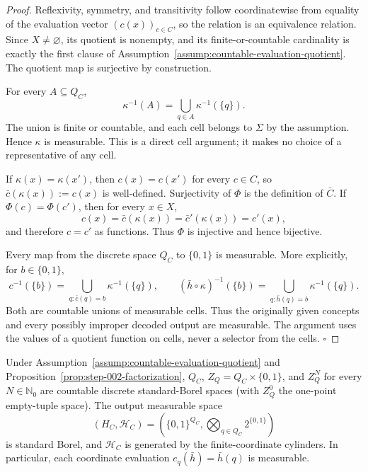 \begin{proof}
Reflexivity, symmetry, and transitivity follow coordinatewise from
equality of the evaluation vector \((c(x))_{c\in C}\), so the relation is an
equivalence relation. Since \(X\ne\varnothing\), its quotient is nonempty,
and its finite-or-countable cardinality is exactly the first clause of
Assumption~\ref{assump:countable-evaluation-quotient}. The quotient map is
surjective by construction.

For every \(A\subseteq Q_C\),
\[
\kappa^{-1}(A)=\bigcup_{q\in A}\kappa^{-1}(\{q\}).
\tag{1}
\]
The union is finite or countable, and each cell belongs to \(\Sigma\) by the
assumption. Hence \(\kappa\) is measurable. This is a direct cell argument;
it makes no choice of a representative of any cell.

If \(\kappa(x)=\kappa(x')\), then \(c(x)=c(x')\) for every \(c\in C\), so
\(\bar c(\kappa(x)):=c(x)\) is well-defined. Surjectivity of \(\Phi\) is the
definition of \(\bar C\). If \(\Phi(c)=\Phi(c')\), then for every \(x\in X\),
\[
c(x)=\bar c(\kappa(x))=\bar c'(\kappa(x))=c'(x),
\]
and therefore \(c=c'\) as functions. Thus \(\Phi\) is injective and hence
bijective.

Every map from the discrete space \(Q_C\) to \(\{0,1\}\) is measurable. More
explicitly, for \(b\in\{0,1\}\),
\[
c^{-1}(\{b\})
=\bigcup_{q:\bar c(q)=b}\kappa^{-1}(\{q\}),
\qquad
(\bar h\circ\kappa)^{-1}(\{b\})
=\bigcup_{q:\bar h(q)=b}\kappa^{-1}(\{q\}).
\tag{2}
\]
Both are countable unions of measurable cells. Thus the originally given
concepts and every possibly improper decoded output are measurable. The
argument uses the values of a quotient function on cells, never a selector
from the cells. \(\square\)


\end{proof}

\begin{proposition}\label{prop:step-002-borel}
Under Assumption~\ref{assump:countable-evaluation-quotient} and
Proposition~\ref{prop:step-002-factorization}, \(Q_C\),
\(Z_Q=Q_C\times\{0,1\}\), and \(Z_Q^N\) for every
\(N\in\mathbb N_0\) are countable discrete standard-Borel spaces (with
\(Z_Q^0\) the one-point empty-tuple space). The output measurable space
\[
(H_C,\mathcal H_C)
=\left(\{0,1\}^{Q_C},\bigotimes_{q\in Q_C}2^{\{0,1\}}\right)
\]
is standard Borel, and \(\mathcal H_C\) is generated by the finite-coordinate
cylinders. In particular, each coordinate evaluation
\(e_q(\bar h)=\bar h(q)\) is measurable.


\end{proposition}

